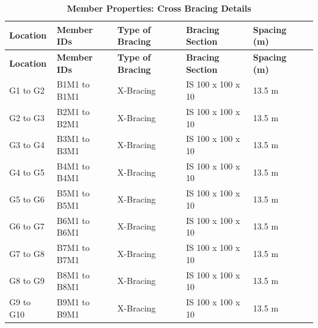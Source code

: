 \documentclass[12pt,a4paper]{report}
\numberwithin{table}{chapter}
\numberwithin{figure}{chapter}
\newcommand{\ReportTablePaddingCompact}{4pt}
\newcommand{\ReportTableRowGap}{6pt}
\begin{document}
\newpage

\vspace{0.4em}
\setlength{\tabcolsep}{\ReportTablePaddingCompact}
\setlength\LTleft{0pt}
\setlength\LTright{\fill}

\begin{longtable}{|L{2.2cm}|L{2.2cm}|L{3.0cm}|L{2.5cm}|C{1.8cm}|C{1.8cm}|}
\caption{\textbf{Member Properties: Cross Bracing Details}}\\
\hline
\textbf{Location} & \textbf{Member IDs} & \textbf{Type of Bracing} & \textbf{Bracing Section} & \textbf{Spacing (m)} \\
\hline
\endfirsthead
\hline
\textbf{Location} & \textbf{Member IDs} & \textbf{Type of Bracing} & \textbf{Bracing Section} & \textbf{Spacing (m)} \\
\hline
\endhead

G1 to G2 & B1M1 to B1M1 & X-Bracing & IS 100 x 100 x 10 & 13.5 m \\[\ReportTableRowGap]
\hline
G2 to G3 & B2M1 to B2M1 & X-Bracing & IS 100 x 100 x 10 & 13.5 m \\[\ReportTableRowGap]
\hline
G3 to G4 & B3M1 to B3M1 & X-Bracing & IS 100 x 100 x 10 & 13.5 m \\[\ReportTableRowGap]
\hline
G4 to G5 & B4M1 to B4M1 & X-Bracing & IS 100 x 100 x 10 & 13.5 m \\[\ReportTableRowGap]
\hline
G5 to G6 & B5M1 to B5M1 & X-Bracing & IS 100 x 100 x 10 & 13.5 m \\[\ReportTableRowGap]
\hline
G6 to G7 & B6M1 to B6M1 & X-Bracing & IS 100 x 100 x 10 & 13.5 m \\[\ReportTableRowGap]
\hline
G7 to G8 & B7M1 to B7M1 & X-Bracing & IS 100 x 100 x 10 & 13.5 m \\[\ReportTableRowGap]
\hline
G8 to G9 & B8M1 to B8M1 & X-Bracing & IS 100 x 100 x 10 & 13.5 m \\[\ReportTableRowGap]
\hline
G9 to G10 & B9M1 to B9M1 & X-Bracing & IS 100 x 100 x 10 & 13.5 m \\[\ReportTableRowGap]
\hline
\end{longtable}

\vspace{0.4em}
\noindent
\setlength{\tabcolsep}{\ReportTablePaddingCompact}
\setlength\LTleft{0pt}
\setlength\LTright{\fill}
\end{document}

